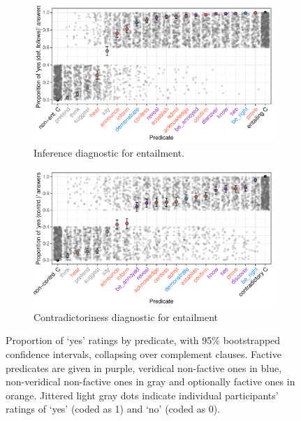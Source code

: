 \documentclass[11pt,fleqn]{article}
\newcommand{\6}{\mbox{$[\hspace*{-.6mm}[$}}
\newcommand{\9}{\mbox{$]\hspace*{-.6mm}]$}}
\begin{document}
{\begin{figure}[H]
\begin{subfigure}{1\textwidth}
\centering
\includegraphics[width=.7\paperwidth]{../../results/7-veridicality3-binary/graphs/proportion-by-predicate-variability-individual}
\caption{Inference diagnostic for entailment.}
\end{subfigure}

\begin{subfigure}{1\textwidth}
\centering
\includegraphics[width=.7\paperwidth]{../../results/6-veridicality2-binary/graphs/proportion-by-predicate-variability-individual}
\caption{Contradictoriness diagnostic for entailment}
\end{subfigure} 

\caption{Proportion of `yes' ratings by predicate, with 95\% bootstrapped confidence intervals, collapsing over complement clauses. Factive predicates are given in purple, veridical non-factive ones in blue, non-veridical non-factive ones in gray and optionally factive ones in orange. Jittered light gray dots indicate individual participants' ratings of `yes' (coded as 1) and `no' (coded as 0). }
\label{f-binary}
\end{figure}

}
\end{document}
